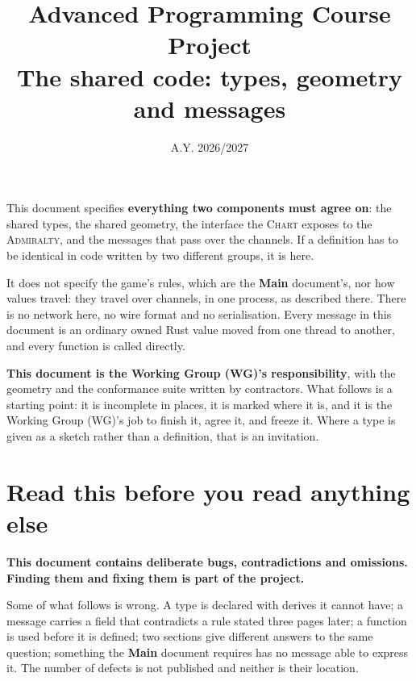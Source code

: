 \documentclass{article}
\title{%
  Advanced Programming Course Project \\
  \large The shared code: types, geometry and messages}
\date{A.Y. 2026/2027}
\author{}
\begin{document}
\newcommand{\WG}{Working Group (WG)\xspace}
\newcommand{\PD}{\textbf{Protocol} document\xspace}
\newcommand{\MD}{\textbf{Main} document\xspace}
\newcommand{\OD}{\textbf{Organisation} document\xspace}

\newcommand{\archipelago}{\textsc{Archipelago}\xspace}
\newcommand{\island}{\textsc{Island}\xspace}
\newcommand{\islands}{\textsc{Islands}\xspace}
\newcommand{\ship}{\textsc{Ship}\xspace}
\newcommand{\ships}{\textsc{Ships}\xspace}
\newcommand{\chart}{\textsc{Chart}\xspace}
\newcommand{\admiralty}{\textsc{Admiralty}\xspace}
\newcommand{\cartographer}{\textsc{Cartographer}\xspace}
\newcommand{\clue}{\textsc{Clue}\xspace}
\newcommand{\clues}{\textsc{Clues}\xspace}
\newcommand{\treasure}{\textsc{Treasure}\xspace}

\maketitle

This document specifies \textbf{everything two components must agree on}: the shared types, the
shared geometry, the interface the \chart{} exposes to the \admiralty, and the messages that pass
over the channels. If a definition has to be identical in code written by two different groups, it
is here.

It does not specify the game's rules, which are the \MD's, nor how values travel: they travel over
channels, in one process, as described there. There is no network here, no wire format and no
serialisation. Every message in this document is an ordinary owned Rust value moved from one
thread to another, and every function is called directly.

\textbf{This document is the \WG's responsibility}, with the geometry and the conformance suite
written by contractors. What follows is a starting point: it is incomplete in places, it is marked
where it is, and it is the \WG's job to finish it, agree it, and freeze it. Where a type is given
as a sketch rather than a definition, that is an invitation.

\section*{Read this before you read anything else}

\textbf{This document contains deliberate bugs, contradictions and omissions. Finding them and
fixing them is part of the project.}

Some of what follows is wrong. A type is declared with derives it cannot have; a message carries a
field that contradicts a rule stated three pages later; a function is used before it is defined;
two sections give different answers to the same question; something the \MD{} requires has no
message able to express it. The number of defects is not published and neither is their location.
\end{document}
